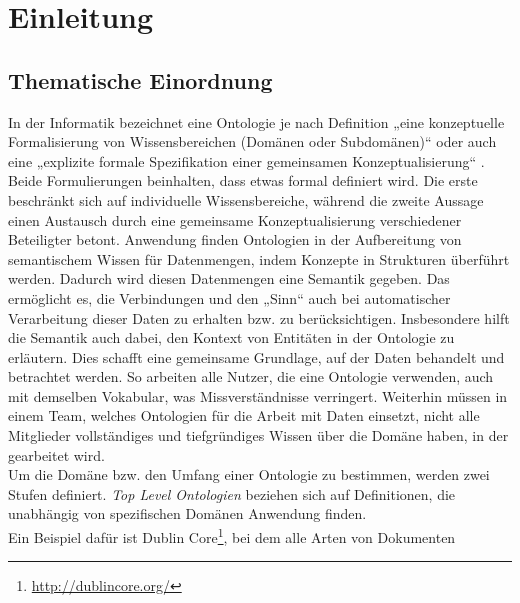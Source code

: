%
\chapter{Einleitung}
\label{chap:introduction}

\section{Thematische Einordnung}
In der Informatik bezeichnet eine Ontologie je nach Definition „eine
konzeptuelle Formalisierung von Wissensbereichen (Domänen oder Subdomänen)“
\cite{Bie02} oder auch eine „explizite formale Spezifikation einer gemeinsamen
Konzeptualisierung“ \cite{Hes02}.\\
Beide Formulierungen beinhalten, dass etwas
formal definiert wird. Die erste beschränkt sich auf individuelle
Wissensbereiche, während die zweite Aussage einen Austausch durch eine
gemeinsame Konzeptualisierung verschiedener Beteiligter betont. Anwendung finden
Ontologien in der Aufbereitung von semantischem Wissen für Datenmengen, indem
Konzepte in Strukturen überführt werden. Dadurch wird diesen Datenmengen eine
Semantik gegeben. Das ermöglicht es, die Verbindungen und den „Sinn“ auch bei
automatischer Verarbeitung dieser Daten zu erhalten bzw. zu berücksichtigen.
Insbesondere hilft die Semantik auch dabei, den Kontext von Entitäten in der
Ontologie zu erläutern.\cite{Bie02} Dies schafft eine gemeinsame Grundlage, auf
der Daten behandelt und betrachtet werden. So arbeiten alle Nutzer, die eine
Ontologie verwenden, auch mit demselben Vokabular, was Missverständnisse
verringert. Weiterhin müssen in einem Team, welches Ontologien für die Arbeit
mit Daten einsetzt, nicht alle Mitglieder vollständiges und tiefgründiges Wissen
über die Domäne haben, in der gearbeitet wird.\\
Um die Domäne bzw. den Umfang einer Ontologie zu bestimmen, werden zwei Stufen
definiert. \textit{Top Level Ontologien} beziehen sich auf Definitionen, die
unabhängig von spezifischen Domänen Anwendung finden. \cite{Bie02} 
\cite{Hes02}\\
Ein Beispiel dafür ist Dublin
Core\footnote{\url{http://dublincore.org/}}, bei dem alle Arten von Dokumenten
